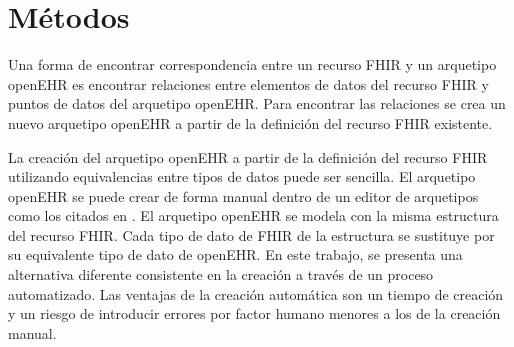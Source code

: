 \section{Métodos}

Una forma de encontrar correspondencia entre un recurso FHIR y un arquetipo openEHR es encontrar relaciones entre elementos de datos del recurso FHIR y puntos de datos del arquetipo openEHR. Para encontrar las relaciones se crea un nuevo arquetipo openEHR a partir de la definición del recurso FHIR existente.

La creación del arquetipo openEHR a partir de la definición del recurso FHIR utilizando equivalencias entre tipos de datos puede ser sencilla. El arquetipo openEHR se puede crear de forma manual dentro de un editor de arquetipos como los citados en \cite{openEHRModellingTools}. El arquetipo openEHR se modela con la misma estructura del recurso FHIR. Cada tipo de dato de FHIR de la estructura se sustituye por su equivalente tipo de dato de openEHR. En este trabajo, se presenta una alternativa diferente consistente en la creación a través de un proceso automatizado. Las ventajas de la creación automática son un tiempo de creación y un riesgo de introducir errores por factor humano menores a los de la creación manual.




